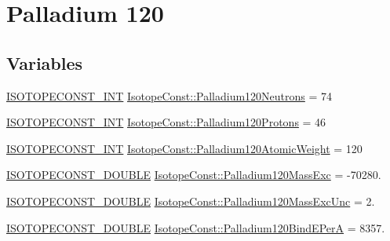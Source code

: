 \hypertarget{group___isotope_const-_palladium-_pd120}{}\section{Palladium 120}
\label{group___isotope_const-_palladium-_pd120}
\subsection*{Variables}
\begin{DoxyCompactItemize}
\item 
\mbox{\hyperlink{group___isotope_const-_macros_ga5f18360b3e99483a35c32d789e62621c}{I\+S\+O\+T\+O\+P\+E\+C\+O\+N\+S\+T\+\_\+\+I\+NT}} \mbox{\hyperlink{group___isotope_const-_palladium-_pd120_gae4cc973af23c55c5fb205e5d7194495c}{Isotope\+Const\+::\+Palladium120\+Neutrons}} = 74
\item 
\mbox{\hyperlink{group___isotope_const-_macros_ga5f18360b3e99483a35c32d789e62621c}{I\+S\+O\+T\+O\+P\+E\+C\+O\+N\+S\+T\+\_\+\+I\+NT}} \mbox{\hyperlink{group___isotope_const-_palladium-_pd120_ga828708d584cecc01c67f5f9f2599c92a}{Isotope\+Const\+::\+Palladium120\+Protons}} = 46
\item 
\mbox{\hyperlink{group___isotope_const-_macros_ga5f18360b3e99483a35c32d789e62621c}{I\+S\+O\+T\+O\+P\+E\+C\+O\+N\+S\+T\+\_\+\+I\+NT}} \mbox{\hyperlink{group___isotope_const-_palladium-_pd120_gadb79b870281725ce2295581c728921d9}{Isotope\+Const\+::\+Palladium120\+Atomic\+Weight}} = 120
\item 
\mbox{\hyperlink{group___isotope_const-_macros_ga8f45a7272ce02c0b4c65c44636ed719a}{I\+S\+O\+T\+O\+P\+E\+C\+O\+N\+S\+T\+\_\+\+D\+O\+U\+B\+LE}} \mbox{\hyperlink{group___isotope_const-_palladium-_pd120_ga575d76a5d455ef5499bae03e2aab3baf}{Isotope\+Const\+::\+Palladium120\+Mass\+Exc}} = -\/70280.
\item 
\mbox{\hyperlink{group___isotope_const-_macros_ga8f45a7272ce02c0b4c65c44636ed719a}{I\+S\+O\+T\+O\+P\+E\+C\+O\+N\+S\+T\+\_\+\+D\+O\+U\+B\+LE}} \mbox{\hyperlink{group___isotope_const-_palladium-_pd120_gaa8cc16390ada3668e7660f68845ee6c4}{Isotope\+Const\+::\+Palladium120\+Mass\+Exc\+Unc}} = 2.
\item 
\mbox{\hyperlink{group___isotope_const-_macros_ga8f45a7272ce02c0b4c65c44636ed719a}{I\+S\+O\+T\+O\+P\+E\+C\+O\+N\+S\+T\+\_\+\+D\+O\+U\+B\+LE}} \mbox{\hyperlink{group___isotope_const-_palladium-_pd120_ga3f044373bf4c0c19006aad9205161bb7}{Isotope\+Const\+::\+Palladium120\+Bind\+E\+PerA}} = 8357.
\item 

\end{DoxyCompactItemize}
